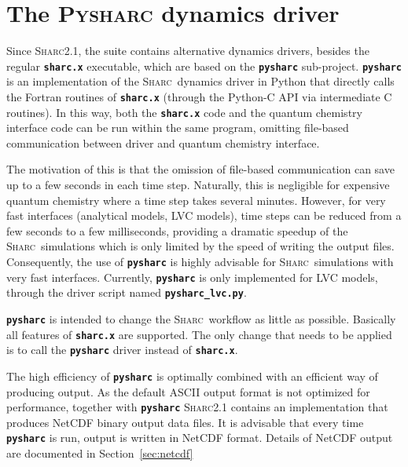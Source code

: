 \documentclass[a4paper,10pt,DIV=15,openany]{scrbook}
\newcommand{\sharc}{\textsc{Sharc}}
\newcommand{\ttt}[1]{\textbf{\texttt{#1}}}
\begin{document}

\section{The \textsc{Pysharc} dynamics driver}\label{sec:pysharc}

Since \sharc2.1, the suite contains alternative dynamics drivers, besides the regular \ttt{sharc.x} executable, which are based on the \ttt{pysharc} sub-project.
\ttt{pysharc} is an implementation of the \sharc\ dynamics driver in Python that directly calls the Fortran routines of \ttt{sharc.x} (through the Python-C API via intermediate C routines).
In this way, both the \ttt{sharc.x} code and the quantum chemistry interface code can be run within the same program, omitting file-based communication between driver and quantum chemistry interface.

The motivation of this is that the omission of file-based communication can save up to a few seconds in each time step.
Naturally, this is negligible for expensive quantum chemistry where a time step takes several minutes.
However, for very fast interfaces (analytical models, LVC models), time steps can be reduced from a few seconds to a few milliseconds, providing a dramatic speedup of the \sharc\ simulations which is only limited by the speed of writing the output files.
Consequently, the use of \ttt{pysharc} is highly advisable for \sharc\ simulations with very fast interfaces.
Currently, \ttt{pysharc} is only implemented for LVC models, through the driver script named \ttt{pysharc\_lvc.py}.

\ttt{pysharc} is intended to change the \sharc\ workflow as little as possible.
Basically all features of \ttt{sharc.x} are supported.
The only change that needs to be applied is to call the \ttt{pysharc} driver instead of \ttt{sharc.x}.

The high efficiency of \ttt{pysharc} is optimally combined with an efficient way of producing output.
As the default ASCII output format is not optimized for performance, together with \ttt{pysharc} \sharc2.1 contains an implementation that produces NetCDF binary output data files.
It is advisable that every time \ttt{pysharc} is run, output is written in NetCDF format.
Details of NetCDF output are documented in Section~\ref{sec:netcdf}
\end{document}
